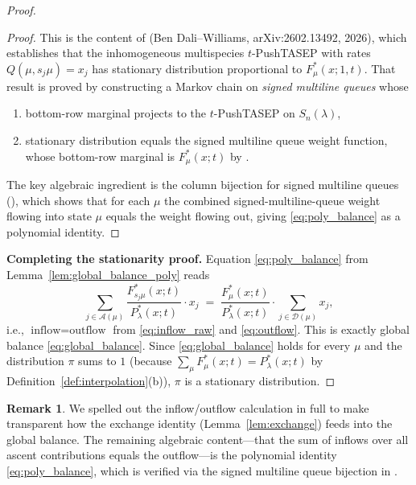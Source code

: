 \documentclass[12pt]{article}
\theoremstyle{definition}
\newtheorem{remark}[theorem]{Remark}
\begin{document}
\begin{proof}
\begin{proof}
This is the content of \cite[Theorem~1.2]{BDW26} (Ben Dali--Williams,
arXiv:2602.13492, 2026), which establishes that the inhomogeneous
multispecies $t$-PushTASEP with rates $Q(\mu,s_j\mu) = x_j$ has stationary
distribution proportional to $F^*_\mu(x;1,t)$.  That result is proved by
constructing a Markov chain on \emph{signed multiline queues} whose
\begin{enumerate}[label=(\alph*)]
  \item bottom-row marginal projects to the $t$-PushTASEP on $S_n(\lambda)$,
  \item stationary distribution equals the signed multiline queue weight
        function, whose bottom-row marginal is $F^*_\mu(x;t)$ by
        \cite[Theorem~1.15]{BDW25}.
\end{enumerate}
The key algebraic ingredient is the column bijection for signed multiline
queues (\cite[Corollary~5.2]{BDW25}), which shows that for each $\mu$ the
combined signed-multiline-queue weight flowing into state $\mu$ equals the
weight flowing out, giving \eqref{eq:poly_balance} as a polynomial identity.
\end{proof}

\noindent\textbf{Completing the stationarity proof.}
Equation \eqref{eq:poly_balance} from Lemma~\ref{lem:global_balance_poly}
reads
\[
  \sum_{j \in \mathcal{A}(\mu)} \frac{F^*_{s_j\mu}(x;t)}{P^*_\lambda(x;t)}
  \cdot x_j
  \;=\;
  \frac{F^*_\mu(x;t)}{P^*_\lambda(x;t)} \cdot \sum_{j \in \mathcal{D}(\mu)} x_j,
\]
i.e., $\text{inflow} = \text{outflow}$ from \eqref{eq:inflow_raw} and
\eqref{eq:outflow}.  This is exactly global balance \eqref{eq:global_balance}.
Since \eqref{eq:global_balance} holds for every $\mu$ and the distribution
$\pi$ sums to $1$ (because
$\sum_{\mu} F^*_\mu(x;t) = P^*_\lambda(x;t)$ by Definition~\ref{def:interpolation}(b)),
$\pi$ is a stationary distribution.
\end{proof}

\begin{remark}\label{rmk:stationarity_direct}
We spelled out the inflow/outflow calculation in full to make transparent
how the exchange identity (Lemma~\ref{lem:exchange}) feeds into the global
balance.  The remaining algebraic content---that the sum of inflows over all
ascent contributions equals the outflow---is the polynomial identity
\eqref{eq:poly_balance}, which is verified via the signed multiline queue
bijection in \cite{BDW25,BDW26}.
\end{remark}
\end{document}
